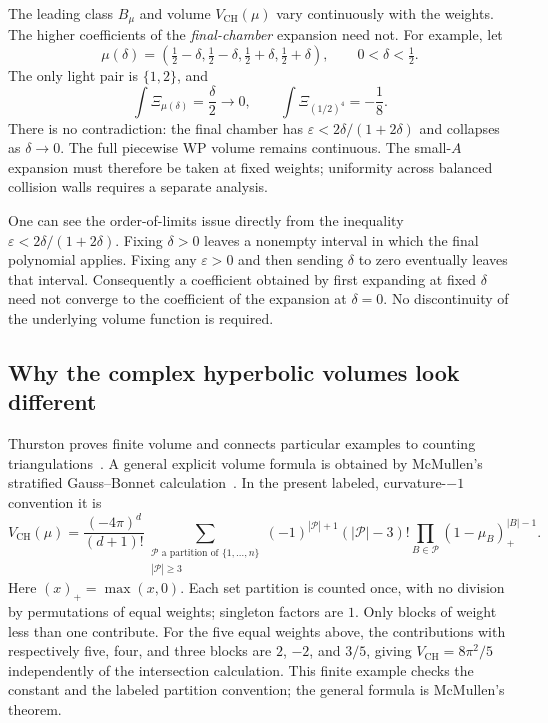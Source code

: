 The leading class $B_\mu$ and volume $V_{\mathrm{CH}}(\mu)$ vary
continuously with the weights. The higher coefficients of the
\emph{final-chamber} expansion need not. For example, let
\[
 \mu(\delta)=\left(\tfrac12-\delta,\tfrac12-\delta,
                    \tfrac12+\delta,\tfrac12+\delta\right),
 \qquad 0<\delta<\tfrac12.
\]
The only light pair is $\{1,2\}$, and
\[
 \int\Xi_{\mu(\delta)}=\frac\delta2\longrightarrow0,
 \qquad
 \int\Xi_{(1/2)^4}=-\frac18.
\]
There is no contradiction: the final chamber has
$\varepsilon<2\delta/(1+2\delta)$ and collapses as $\delta\to0$.
The full piecewise WP volume remains continuous. The small-$A$
expansion must therefore be taken at fixed weights; uniformity
across balanced collision walls requires a separate analysis.

One can see the order-of-limits issue directly from the inequality
$\varepsilon<2\delta/(1+2\delta)$. Fixing $\delta>0$ leaves a
nonempty interval in which the final polynomial applies. Fixing
any $\varepsilon>0$ and then sending $\delta$ to zero eventually
leaves that interval. Consequently a coefficient obtained by first
expanding at fixed $\delta$ need not converge to the coefficient
of the expansion at $\delta=0$. No discontinuity of the underlying
volume function is required.

\subsection{Why the complex hyperbolic volumes look different}

Thurston proves finite volume and connects particular examples to
counting triangulations~\cite{ThurstonShapes}. A general explicit
volume formula is obtained by McMullen's stratified Gauss--Bonnet
calculation~\cite[Theorem 8.1]{McMullenGB}. In the present labeled,
curvature-$-1$ convention it is
\begin{equation}
 V_{\mathrm{CH}}(\mu)=\frac{(-4\pi)^d}{(d+1)!}
 \sum_{\substack{\mathcal P\text{ a partition of }\{1,\ldots,n\}\\
                  |\mathcal P|\ge3}}
 (-1)^{|\mathcal P|+1}(|\mathcal P|-3)!
 \prod_{B\in\mathcal P}(1-\mu_B)_+^{|B|-1}.
 \label{eq:McMullenpartitionvolume}
\end{equation}
Here $(x)_+=\max(x,0)$. Each set partition is counted once, with
no division by permutations of equal weights; singleton factors are
$1$. Only blocks of weight less than one contribute. For the five
equal weights above, the contributions with respectively five, four,
and three blocks are $2$, $-2$, and $3/5$, giving
$V_{\mathrm{CH}}=8\pi^2/5$ independently of the intersection
calculation. This finite example checks the constant and the labeled
partition convention; the general formula is McMullen's theorem.

